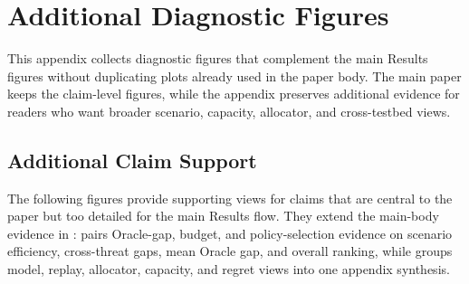 \section{Additional Diagnostic Figures}
\label{app:diagnostic_figures}

This appendix collects diagnostic figures that complement the main Results figures without duplicating plots already used in the paper body. The main paper keeps the claim-level figures, while the appendix preserves additional evidence for readers who want broader scenario, capacity, allocator, and cross-testbed views.

\subsection{Additional Claim Support}
\label{app:checkpoint_claim_support}

The following figures provide supporting views for claims that are central to the paper but too detailed for the main Results flow. They extend the main-body evidence in :  pairs Oracle-gap, budget, and policy-selection evidence on scenario efficiency, cross-threat gaps, mean Oracle gap, and overall ranking, while  groups model, replay, allocator, capacity, and regret views into one appendix synthesis.

